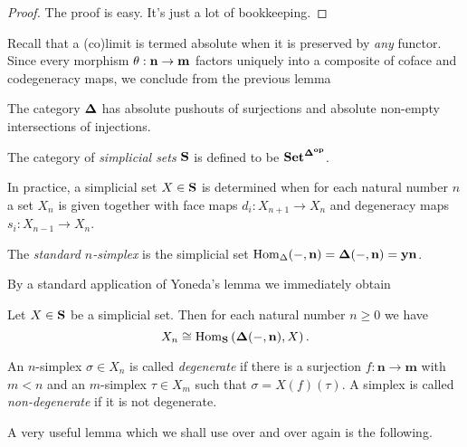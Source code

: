 \begin{proof}
The proof is easy. It's just a lot of bookkeeping.
\end{proof}
Recall that a (co)limit is termed absolute when it is preserved by \emph{any} functor. Since every morphism $\theta : \bf{n} \to \bf{m}$ factors uniquely into a composite of coface and codegeneracy maps, we conclude from the previous lemma
\begin{theorem}
\label{thm:absolute colimits and limits in the order category}
The category $\bf{\Delta}$ has absolute pushouts of surjections and absolute non-empty intersections of injections.
\end{theorem}

\begin{definition}
The category of \emph{simplicial sets} $\bf{S}$ is defined to be $\mathbf{Set}^{\bf{\Delta}^{op}}$.
\end{definition}
In practice, a simplicial set $X \in \bf{S}$ is determined when for each natural number $n$ a set $X_n$ is given together with face maps $d_i : X_{n+1} \to X_{n}$ and degeneracy maps $s_i : X_{n-1} \to X_{n}$.

\begin{definition}
The \emph{standard $n$-simplex} is the simplicial set $\operatorname{Hom}_{\Delta}(-,\bf{n}) = \bf{\Delta}(-,\bf{n}) = \bf{y}\bf{n}$.
\end{definition}

By a standard application of Yoneda's lemma we immediately obtain

\begin{lemma}
Let $X \in \bf{S}$ be a simplicial set. Then for each natural number $n \geq 0$ we have
\[ X_n \cong \operatorname{Hom}_{\mathbf{S}}\left( \mathbf{\Delta}(-,\mathbf{n}) , X \right). \]
\end{lemma}

\begin{definition}
An $n$-simplex $\sigma \in X_n$ is called \emph{degenerate} if there is a surjection $f : \mathbf{n} \to \mathbf{m}$ with $m < n$ and an $m$-simplex $\tau \in X_m$ such that $\sigma = X(f)(\tau)$. A simplex is called \emph{non-degenerate} if it is not degenerate.
\end{definition}

A very useful lemma which we shall use over and over again is the following.

